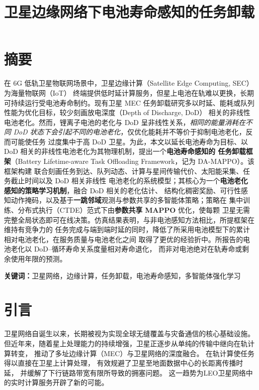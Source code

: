 \documentclass[a4paper,11pt]{article}
\begin{document}
\title{卫星边缘网络下电池寿命感知的任务卸载}
\author{}
\date{}
\maketitle

\section{摘要}

在 6G 低轨卫星物联网场景中，卫星边缘计算（Satellite Edge Computing, SEC）为海量物联网（IoT）
终端提供低时延计算服务，但星上电池在轨难以更换，长期可持续运行受电池寿命制约。现有卫星 MEC
任务卸载研究多以时延、能耗或队列性能为优化目标，较少刻画放电深度（Depth of Discharge, DoD）
相关的非线性电池老化。然而，锂离子电池的老化与 DoD 呈非线性关系，\emph{相同的能量消耗在不同
DoD 状态下会引起不同的电池老化}，仅优化能耗并不等价于抑制电池老化，反而可能使任务
过度集中于高 DoD 卫星。为此，本文以延长电池寿命为目标、以 DoD 相关的非线性电池老化为其物理机制，提出一个\textbf{电池寿命感知的
任务卸载框架}（Battery Lifetime-aware Task Offloading Framework，记为 DA-MAPPO）。该框架构建
联合刻画任务到达、队列动态、计算与星间传输代价、太阳能采集、任务截止时间以及 DoD 相关非线性
电池老化的系统模型；其核心为一个\textbf{电池老化感知的策略学习机制}，融合 DoD 相关的老化估计、
结构化稠密奖励、可行性感知动作掩码，以及基于\textbf{一跳邻域}观测与参数共享的多智能体策略；策略在
集中训练、分布式执行（CTDE）范式下由\textbf{参数共享 MAPPO} 优化，使每颗
卫星无需完整全局状态即可在线决策。仿真结果表明，与非电池感知方法相比，所提框架在维持有竞争力的
任务完成与端到端时延的同时，降低了所采用电池模型下的累计相对电池老化，在服务质量与电池老化之间
取得了更优的经验折中。所报告的电池老化以 DoD--循环寿命关系度量相对寿命退化，
而非对电池绝对在轨寿命或剩余使用年限的预测。

\noindent\textbf{关键词：}卫星网络，边缘计算，任务卸载，电池寿命感知，多智能体强化学习

\section{引言}

卫星网络自诞生以来，长期被视为实现全球无缝覆盖与灾备通信的核心基础设施。
但近年来，随着星上处理能力的持续增强，卫星正逐步从单纯的传输中继向在轨计算转变，
推动了多址边缘计算（MEC）与卫星网络的深度融合\cite{zhang2024mhspo}。
在轨计算使任务得以直接在卫星上计算处理，
有效规避了卫星至地面数据中心的长距离传播时延，
并缓解了下行链路带宽有限所导致的拥塞问题。
这一趋势为LEO卫星网络中的实时计算服务开辟了新的可能。
\end{document}
